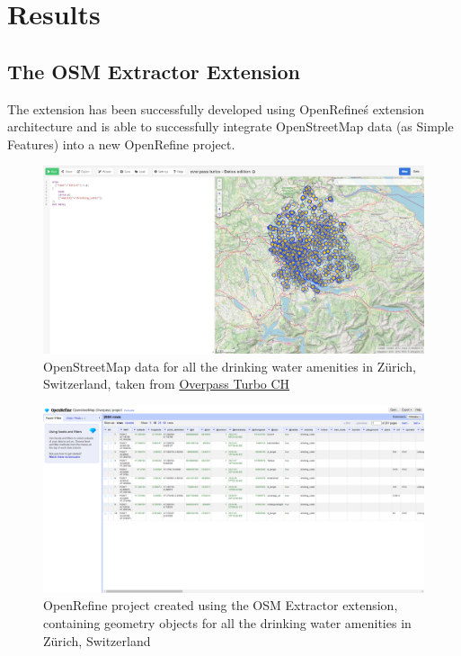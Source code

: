 \section*{Results}
\subsection*{The OSM Extractor Extension}
The extension has been successfully developed using OpenRefine\'s extension architecture and is able to successfully
integrate OpenStreetMap data (as Simple Features) into a new OpenRefine project.
\begin{figure}[H]
        \includegraphics[width=\textwidth]{./Figures/ManagementSummary/osm_extractor_overpass_query}
        \caption{OpenStreetMap data for all the drinking water amenities in Zürich, Switzerland, taken from \href{http://overpass-turbo.osm.ch/}{Overpass Turbo CH}}
\end{figure}
\begin{figure}[H]
    \includegraphics[width=\textwidth]{./Figures/ManagementSummary/osm_extractor_project}
    \caption{OpenRefine project created using the OSM Extractor extension, containing geometry objects for all the drinking water amenities in Zürich, Switzerland}
\end{figure}

